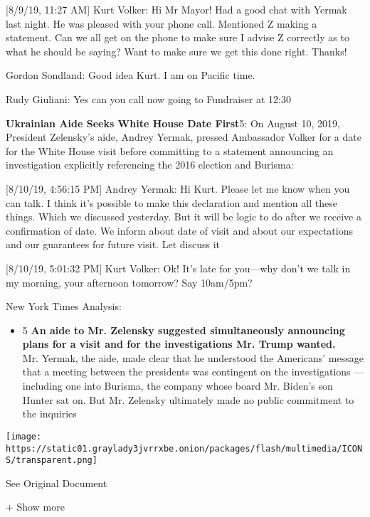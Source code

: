 {[}8/9/19, 11:27 AM{]} Kurt Volker: Hi Mr Mayor! Had a good chat with
Yermak last night. He was pleased with your phone call. Mentioned Z
making a statement. Can we all get on the phone to make sure I advise Z
correctly as to what he should be saying? Want to make sure we get this
done right. Thanks!

Gordon Sondland: Good idea Kurt. I am on Pacific time.

Rudy Giuliani: Yes can you call now going to Fundraiser at 12:30

\textbf{Ukrainian Aide Seeks White House Date First}5: On August 10,
2019, President Zelensky's aide, Andrey Yermak, pressed Ambassador
Volker for a date for the White House visit before committing to a
statement announcing an investigation explicitly referencing the 2016
election and Burisma:

{[}8/10/19, 4:56:15 PM{]} Andrey Yermak: Hi Kurt. Please let me know
when you can talk. I think it's possible to make this declaration and
mention all these things. Which we discussed yesterday. But it will be
logic to do after we receive a confirmation of date. We inform about
date of visit and about our expectations and our guarantees for future
visit. Let discuss it

{[}8/10/19, 5:01:32 PM{]} Kurt Volker: Ok! It's late for you---why don't
we talk in my morning, your afternoon tomorrow? Say 10am/5pm?

New York Times Analysis:

\begin{itemize}
\tightlist
\item
  5 \textbf{An aide to Mr. Zelensky suggested simultaneously announcing
  plans for a visit and for the investigations Mr. Trump wanted.}\\
  Mr. Yermak, the aide, made clear that he understood the Americans'
  message that a meeting between the presidents was contingent on the
  investigations --- including one into Burisma, the company whose board
  Mr. Biden's son Hunter sat on. But Mr. Zelensky ultimately made no
  public commitment to the inquiries
\end{itemize}

\protect\hyperlink{}{}

\texttt{[image: https://static01.graylady3jvrrxbe.onion/packages/flash/multimedia/ICONS/transparent.png]}

See Original Document

+ Show more

\protect\hyperlink{}{}

